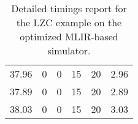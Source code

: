 \begin{table}[h]
{\begin{tabular}{cccccc}
            37.96              & 0                          & 0                          & 15                         & 20                         & 2.96                   \\
            37.89              & 0                          & 0                          & 15                         & 20                         & 2.89                   \\
            38.03              & 0                          & 0                          & 15                         & 20                         & 3.03                   \\
            \bottomrule
        \end{tabular}
    }
    \caption{Detailed timings report for the LZC example on the optimized MLIR-based simulator.}
\end{table}

